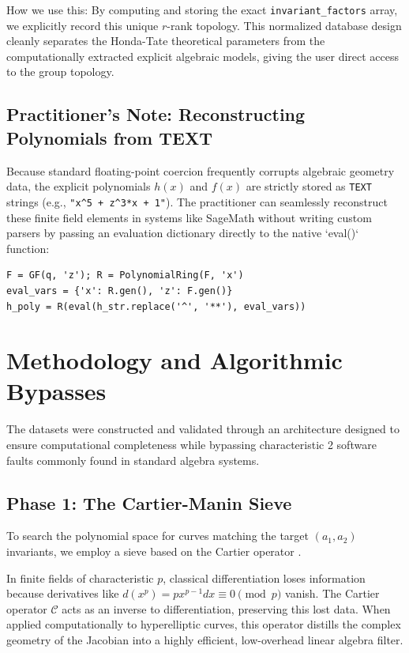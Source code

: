 \documentclass[letterpaper, 11pt]{article}
\begin{document}
How we use this: By computing and storing the exact \texttt{invariant\_factors} array, we explicitly record this unique $r$-rank topology. This normalized database design cleanly separates the Honda-Tate theoretical parameters from the computationally extracted explicit algebraic models, giving the user direct access to the group topology.

\subsection{Practitioner's Note: Reconstructing Polynomials from TEXT}
Because standard floating-point coercion frequently corrupts algebraic geometry data, the explicit polynomials $h(x)$ and $f(x)$ are strictly stored as \texttt{TEXT} strings (e.g., \texttt{"x\textasciicircum 5 + z\textasciicircum 3*x + 1"}). The practitioner can seamlessly reconstruct these finite field elements in systems like SageMath \cite{SageMath2026} without writing custom parsers by passing an evaluation dictionary directly to the native `eval()` function:
\begin{verbatim}
F = GF(q, 'z'); R = PolynomialRing(F, 'x')
eval_vars = {'x': R.gen(), 'z': F.gen()}
h_poly = R(eval(h_str.replace('^', '**'), eval_vars))
\end{verbatim}

\section{Methodology and Algorithmic Bypasses}
The datasets were constructed and validated through an architecture designed to ensure computational completeness while bypassing characteristic 2 software faults commonly found in standard algebra systems.

\subsection{Phase 1: The Cartier-Manin Sieve}
To search the polynomial space for curves matching the target $(a_1, a_2)$ invariants, we employ a sieve based on the Cartier operator \cite{Cartier1958}. 

In finite fields of characteristic $p$, classical differentiation loses information because derivatives like $d(x^p) = px^{p-1} dx \equiv 0 \pmod p$ vanish. The Cartier operator $\mathcal{C}$ acts as an inverse to differentiation, preserving this lost data. When applied computationally to hyperelliptic curves, this operator distills the complex geometry of the Jacobian into a highly efficient, low-overhead linear algebra filter.
\end{document}
